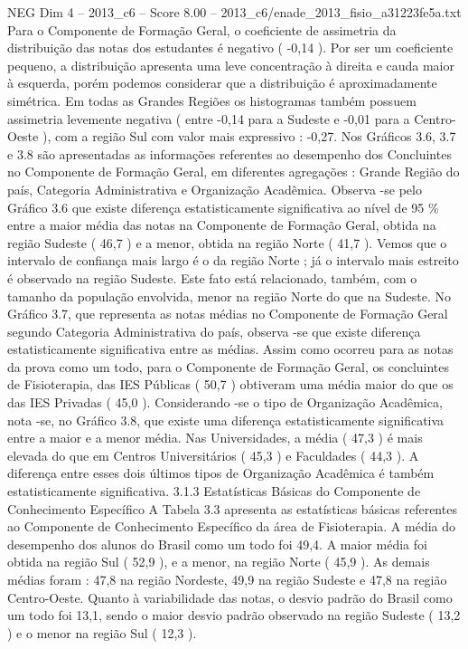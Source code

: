 \begin{textsample}{NEG Dim 4 – 2013\_c6 – Score 8.00 – 2013\_c6/enade\_2013\_fisio\_a31223fe5a.txt}
Para o Componente de Formação Geral, o coeficiente de assimetria da distribuição das notas dos estudantes é negativo ( -0,14 ).
Por ser um coeficiente pequeno, a distribuição apresenta uma leve concentração à direita e cauda maior à esquerda, porém podemos considerar que a distribuição é aproximadamente simétrica.
Em todas as Grandes Regiões os histogramas também possuem assimetria levemente negativa ( entre -0,14 para a Sudeste e -0,01 para a Centro-Oeste ), com a região Sul com valor mais expressivo : -0,27.
Nos Gráficos 3.6, 3.7 e 3.8 são apresentadas as informações referentes ao desempenho dos Concluintes no Componente de Formação Geral, em diferentes agregações : Grande Região do país, Categoria Administrativa e Organização Acadêmica.
Observa -se pelo Gráfico 3.6 que existe diferença estatisticamente significativa ao nível de 95 \% entre a maior média das notas na Componente de Formação Geral, obtida na região Sudeste ( 46,7 ) e a menor, obtida na região Norte ( 41,7 ).
Vemos que o intervalo de confiança mais largo é o da região Norte ; já o intervalo mais estreito é observado na região Sudeste.
Este fato está relacionado, também, com o tamanho da população envolvida, menor na região Norte do que na Sudeste.
No Gráfico 3.7, que representa as notas médias no Componente de Formação Geral segundo Categoria Administrativa do país, observa -se que existe diferença estatisticamente significativa entre as médias.
Assim como ocorreu para as notas da prova como um todo, para o Componente de Formação Geral, os concluintes de Fisioterapia, das IES Públicas ( 50,7 ) obtiveram uma média maior do que os das IES Privadas ( 45,0 ).
Considerando -se o tipo de Organização Acadêmica, nota -se, no Gráfico 3.8, que existe uma diferença estatisticamente significativa entre a maior e a menor média.
Nas Universidades, a média ( 47,3 ) é mais elevada do que em Centros Universitários ( 45,3 ) e Faculdades ( 44,3 ).
A diferença entre esses dois últimos tipos de Organização Acadêmica é também estatisticamente significativa. 3.1.3 Estatísticas Básicas do Componente de Conhecimento Específico A Tabela 3.3 apresenta as estatísticas básicas referentes ao Componente de Conhecimento Específico da área de Fisioterapia.
A média do desempenho dos alunos do Brasil como um todo foi 49,4.
A maior média foi obtida na região Sul ( 52,9 ), e a menor, na região Norte ( 45,9 ).
As demais médias foram : 47,8 na região Nordeste, 49,9 na região Sudeste e 47,8 na região Centro-Oeste.
Quanto à variabilidade das notas, o desvio padrão do Brasil como um todo foi 13,1, sendo o maior desvio padrão observado na região Sudeste ( 13,2 ) e o menor na região Sul ( 12,3 ).

\end{textsample}
